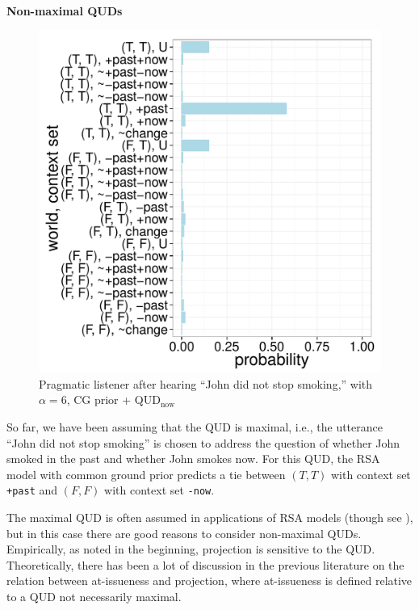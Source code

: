 \ 

\noindent\textbf{Non-maximal QUDs}

\begin{figure}
 \includegraphics[scale=0.48]{figs/joint_CGprior_QUDnow.pdf}
 \caption{Pragmatic listener after hearing ``John did not stop smoking,'' with $\alpha=6$, CG prior + QUD$_\text{now}$\label{fig:joint-QUDnow}}
\end{figure}

So far, we have been assuming that the QUD is maximal, i.e., the utterance 
 ``John did not stop smoking'' is chosen to address the question of
 whether John smoked in the past and whether John smokes now.
For this QUD, the RSA model with common ground prior predicts a tie between 
 $(T, T)$ with context set \verb=+past= and
 $(F, F)$ with context set \verb=-now=.
 
The maximal QUD is often assumed in applications of RSA models (though see ), but 
 in this case there are good reasons to consider non-maximal QUDs.
Empirically, as noted in the beginning, projection is sensitive to the QUD.
Theoretically, there has been a lot of discussion in the previous literature
 \cite{Beaver2010:Have-You-Noticed, SimonsEtAl2001:What-Projects-and-Why} on the relation between at-issueness and projection, where at-issueness is defined 
 relative to a QUD not necessarily maximal.
 
